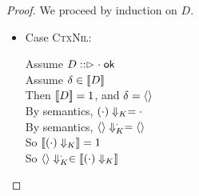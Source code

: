 \begin{proof}
We proceed by induction on $D$. \\
\begin{itemize}
\item Case \textsc{CtxNil}:
  \begin{tabbedproof}
    \oo Assume $D :: \vartriangleright {\cdot} \;\mathsf{ok}$ \\
    \oo Assume $\delta \in [\![{D}]\!]$ \\
    \ooo Then $[\![{D}]\!] = 1$, and $\delta = \left<\right>$ \\
    \ooo By semantics, $({\cdot})\Downarrow_K = \cdot$ \\
    \ooo By semantics, ${\left<\right>}\Downarrow^{\cdot}_K = \left<\right>$ \\
    \ooo So $[\![{({\cdot})\Downarrow_K}]\!] = 1$\\
    \ooo So ${\left<\right>}\Downarrow^{\cdot}_K \in [\![{({\cdot})\Downarrow_K}]\!]$ \\
  \end{tabbedproof}


\end{itemize}
\end{proof}
